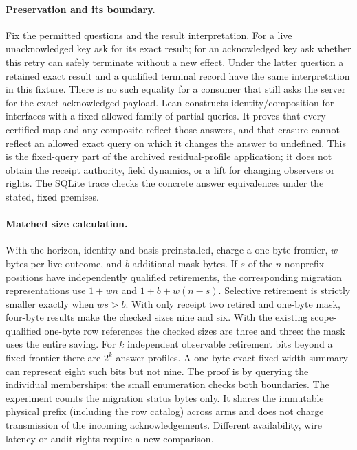 \documentclass{article}
\begin{document}
\paragraph{Preservation and its boundary.}
Fix the permitted questions and the result interpretation. For a live
unacknowledged key ask for its exact result; for an acknowledged key
ask whether this retry can safely terminate without a new effect. Under
the latter question a retained exact result and a qualified terminal
record have the same interpretation in this fixture. There is no
such equality for a consumer that still asks the server for the exact
acknowledged payload. Lean constructs identity/composition for
interfaces with a fixed allowed family of partial queries. It proves
that every certified map and any composite reflect those answers, and
that erasure cannot reflect an allowed exact query on which it changes
the answer to undefined. This is the fixed-query part of the
\href{https://github.com/eternal-november/eos-research-programmes/pull/693}{archived residual-profile application};
it does not obtain the receipt authority, field dynamics, or a lift
for changing observers or rights. The SQLite trace checks the concrete
answer equivalences under the stated, fixed premises.

\paragraph{Matched size calculation.}
With the horizon, identity and basis preinstalled, charge a one-byte
frontier, $w$ bytes per live outcome, and $b$ additional mask bytes.
If $s$ of the $n$ nonprefix positions have independently qualified
retirements, the corresponding migration representations use
$1+wn$ and $1+b+w(n-s)$. Selective retirement is strictly smaller
exactly when $ws>b$. With only receipt two retired and one-byte mask,
four-byte results make the checked sizes nine and six. With the
existing scope-qualified one-byte row references the checked sizes are
three and three: the mask uses the entire saving. For $k$ independent
observable retirement bits beyond a fixed frontier there are $2^k$
answer profiles. A one-byte exact fixed-width summary can represent
eight such bits but not nine. The proof is by querying the individual
memberships; the small enumeration checks both boundaries.
The experiment counts the migration status bytes only. It shares
the immutable physical prefix (including the row catalog) across
arms and does not charge transmission of the incoming acknowledgements.
Different availability, wire latency or audit rights require a new comparison.
\end{document}
